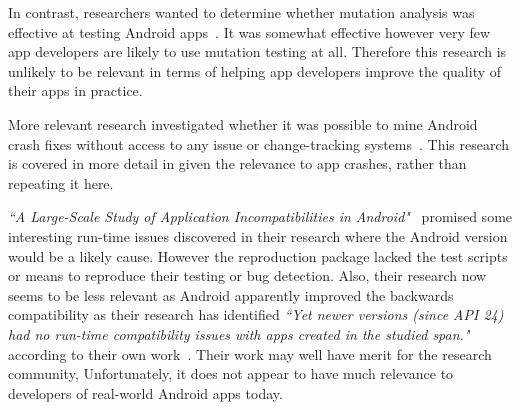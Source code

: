 In contrast, researchers wanted to determine whether mutation analysis was effective at testing Android apps~. It was somewhat effective however very few app developers are likely to use mutation testing at all. Therefore this research is unlikely to be relevant in terms of helping app developers improve the quality of their apps in practice.

More relevant research investigated whether it was possible to mine Android crash fixes without access to any issue or change-tracking systems~. This research is covered in more detail in  given the relevance to app crashes, rather than repeating it here. %

\emph{``A Large-Scale Study of Application Incompatibilities in Android"}~ promised some interesting run-time issues discovered in their research where the Android version would be a likely cause. However the reproduction package lacked the test scripts or means to reproduce their testing or bug detection. Also, their research now seems to be less relevant as Android apparently improved the backwards compatibility as their research has identified \emph{``Yet newer versions (since API 24) had no run-time compatibility issues with apps created in the studied span."} according to their own work~. Their work may well have merit for the research community, Unfortunately, it does not appear to have much relevance to developers of real-world Android apps today.

